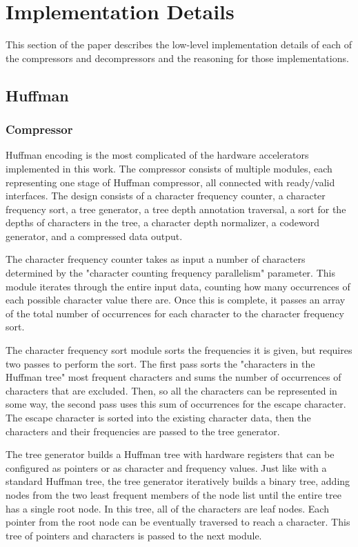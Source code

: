 \documentclass[doublespace,nopageskip]{VTthesis}
\begin{document}
\section{Implementation Details}\label{se:design_details}
This section of the paper describes the low-level implementation details of each of the compressors and decompressors and the reasoning for those implementations.

\subsection{Huffman}\label{ss:huffman}
\subsubsection{Compressor}\label{sss:compressor}
Huffman encoding is the most complicated of the hardware accelerators implemented in this work. The compressor consists of multiple modules, each representing one stage of Huffman compressor, all connected with ready/valid interfaces. The design consists of a character frequency counter, a character frequency sort, a tree generator, a tree depth annotation traversal, a sort for the depths of characters in the tree, a character depth normalizer, a codeword generator, and a compressed data output.

The character frequency counter takes as input a number of characters determined by the "character counting frequency parallelism" parameter. This module iterates through the entire input data, counting how many occurrences of each possible character value there are. Once this is complete, it passes an array of the total number of occurrences for each character to the character frequency sort.

The character frequency sort module sorts the frequencies it is given, but requires two passes to perform the sort. The first pass sorts the "characters in the Huffman tree" most frequent characters and sums the number of occurrences of characters that are excluded. Then, so all the characters can be represented in some way, the second pass uses this sum of occurrences for the escape character. The escape character is sorted into the existing character data, then the characters and their frequencies are passed to the tree generator.

The tree generator builds a Huffman tree with hardware registers that can be configured as pointers or as character and frequency values. Just like with a standard Huffman tree, the tree generator iteratively builds a binary tree, adding nodes from the two least frequent members of the node list until the entire tree has a single root node. In this tree, all of the characters are leaf nodes. Each pointer from the root node can be eventually traversed  to reach a character. This tree of pointers and characters is passed to the next module.
\end{document}
